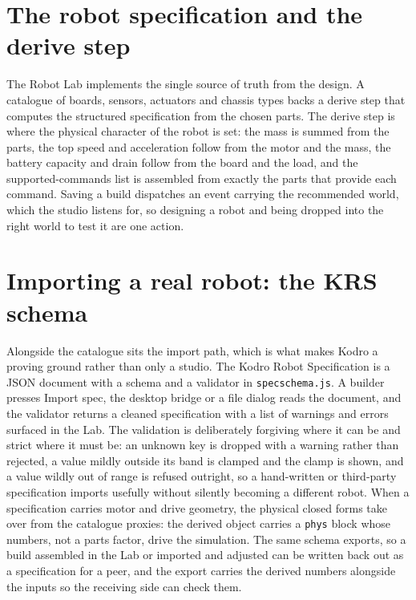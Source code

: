 \documentclass[11pt,a4paper]{report}
\begin{document}
\section{The robot specification and the derive step}
The Robot Lab implements the single source of truth from the design. A catalogue of boards, sensors, actuators and chassis types backs a derive step that computes the structured specification from the chosen parts. The derive step is where the physical character of the robot is set: the mass is summed from the parts, the top speed and acceleration follow from the motor and the mass, the battery capacity and drain follow from the board and the load, and the supported-commands list is assembled from exactly the parts that provide each command. Saving a build dispatches an event carrying the recommended world, which the studio listens for, so designing a robot and being dropped into the right world to test it are one action.

\section{Importing a real robot: the KRS schema}
Alongside the catalogue sits the import path, which is what makes Kodro a proving ground rather than only a studio. The Kodro Robot Specification is a JSON document with a schema and a validator in \texttt{specschema.js}. A builder presses Import spec, the desktop bridge or a file dialog reads the document, and the validator returns a cleaned specification with a list of warnings and errors surfaced in the Lab. The validation is deliberately forgiving where it can be and strict where it must be: an unknown key is dropped with a warning rather than rejected, a value mildly outside its band is clamped and the clamp is shown, and a value wildly out of range is refused outright, so a hand-written or third-party specification imports usefully without silently becoming a different robot. When a specification carries motor and drive geometry, the physical closed forms take over from the catalogue proxies: the derived object carries a \texttt{phys} block whose numbers, not a parts factor, drive the simulation. The same schema exports, so a build assembled in the Lab or imported and adjusted can be written back out as a specification for a peer, and the export carries the derived numbers alongside the inputs so the receiving side can check them.
\end{document}
